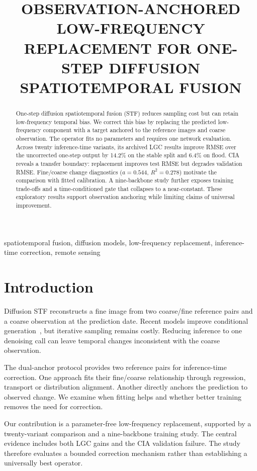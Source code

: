 \documentclass{article}
\title{OBSERVATION-ANCHORED LOW-FREQUENCY REPLACEMENT FOR ONE-STEP DIFFUSION SPATIOTEMPORAL FUSION}
\begin{document}
\ninept
\maketitle

\begin{abstract}
One-step diffusion spatiotemporal fusion (STF) reduces sampling cost but can retain low-frequency temporal bias.
We correct this bias by replacing the predicted low-frequency component with a target anchored to the reference images and coarse observation.
The operator fits no parameters and requires one network evaluation.
Across twenty inference-time variants, its archived LGC results improve RMSE over the uncorrected one-step output by 14.2\% on the stable split and 6.4\% on flood.
CIA reveals a transfer boundary: replacement improves test RMSE but degrades validation RMSE.
Fine/coarse change diagnostics ($a=0.544$, $R^2=0.278$) motivate the comparison with fitted calibration.
A nine-backbone study further exposes training trade-offs and a time-conditioned gate that collapses to a near-constant.
These exploratory results support observation anchoring while limiting claims of universal improvement.
\end{abstract}
\begin{keywords}
spatiotemporal fusion, diffusion models, low-frequency replacement, inference-time correction, remote sensing
\end{keywords}

\section{Introduction}
\label{sec:intro}
Diffusion STF reconstructs a fine image from two coarse/fine reference pairs and a coarse observation at the prediction date.
Recent models improve conditional generation~\cite{huang2024stfdiff,zhang2026sastf,zhu2026dpdiff}, but iterative sampling remains costly.
Reducing inference to one denoising call can leave temporal changes inconsistent with the coarse observation.

The dual-anchor protocol provides two reference pairs for inference-time correction.
One approach fits their fine/coarse relationship through regression, transport or distribution alignment.
Another directly anchors the prediction to observed change.
We examine when fitting helps and whether better training removes the need for correction.

Our contribution is a parameter-free low-frequency replacement, supported by a twenty-variant comparison and a nine-backbone training study.
The central evidence includes both LGC gains and the CIA validation failure.
The study therefore evaluates a bounded correction mechanism rather than establishing a universally best operator.
\end{document}
